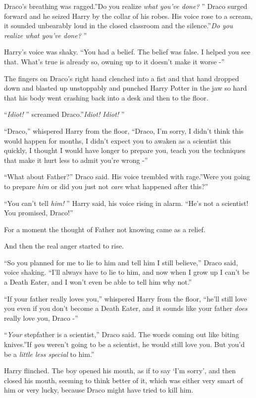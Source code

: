 Draco's breathing was ragged.''Do you realize \emph{what you've done?} ''
Draco surged forward and he seized Harry by the collar of his robes. His
voice rose to a scream, it sounded unbearably loud in the closed
classroom and the silence.''\emph{Do you realize what you've done?} ''

Harry's voice was shaky. ``You had a belief. The belief was false. I
helped you see that. What's true is already so, owning up to it doesn't
make it worse -''

The fingers on Draco's right hand clenched into a fist and that hand
dropped down and blasted up unstoppably and punched Harry Potter in the
jaw so hard that his body went crashing back into a desk and then to the
floor.

``\emph{Idiot!} '' screamed Draco.''\emph{Idiot! Idiot!} ''

``Draco,'' whispered Harry from the floor, ``Draco, I'm sorry, I didn't
think this would happen for months, I didn't expect you to awaken as a
scientist this quickly, I thought I would have longer to prepare you,
teach you the techniques that make it hurt less to admit you're wrong
-''

``What about Father?'' Draco said. His voice trembled with rage.''Were
you going to prepare \emph{him} or did you just not \emph{care} what
happened after this?''

``You can't tell \emph{him!} '' Harry said, his voice rising in alarm.
``He's not a scientist! You promised, Draco!''

For a moment the thought of Father not knowing came as a relief.

And then the real anger started to rise.

``So you planned for me to lie to him and tell him I still believe,''
Draco said, voice shaking. ``I'll always have to lie to him, and now
when I grow up I can't be a Death Eater, and I won't even be able to
tell him why not.''

``If your father really loves you,'' whispered Harry from the floor,
``he'll still love you even if you don't become a Death Eater, and it
sounds like your father \emph{does} really love you, Draco -''

``\emph{Your} stepfather is a scientist,'' Draco said. The words coming
out like biting knives.''If \emph{you} weren't going to be a scientist,
he would still love you. But you'd be a \emph{little less special} to
him.''

Harry flinched. The boy opened his mouth, as if to say `I'm sorry', and
then closed his mouth, seeming to think better of it, which was either
very smart of him or very lucky, because Draco might have tried to kill
him.

